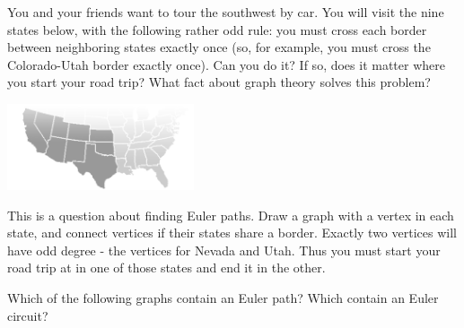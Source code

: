\begin{questions}

		


\question You and your friends want to tour the southwest by car.  You will visit the nine states below, with the following rather odd rule: you must cross each border between neighboring states exactly once (so, for example, you must cross the Colorado-Utah border exactly once).  Can you do it?  If so, does it matter where you start your road trip?  What fact about graph theory solves this problem?

\centerline{\includegraphics[height=1in]{images/southwest_map.png}}

	\begin{answer}
		This is a question about finding Euler paths.  Draw a graph with a vertex in each state, and connect vertices if their states share a border.  Exactly two vertices will have odd degree - the vertices for Nevada and Utah.  Thus you must start your road trip at in one of those states and end it in the other. %
	\end{answer}
	
	
	





\question Which of the following graphs contain an Euler path?  Which contain an Euler circuit?
\end{questions}

